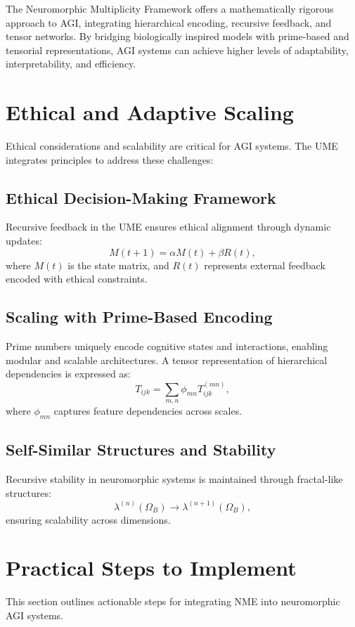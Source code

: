 \documentclass{article}
\theoremstyle{plain}
\begin{document}
\begin{itemize}
\begin{itemize}
The Neuromorphic Multiplicity Framework offers a mathematically rigorous approach to AGI, integrating hierarchical encoding, recursive feedback, and tensor networks. By bridging biologically inspired models with prime-based and tensorial representations, AGI systems can achieve higher levels of adaptability, interpretability, and efficiency.

\section{Ethical and Adaptive Scaling}
Ethical considerations and scalability are critical for AGI systems. The UME integrates principles to address these challenges:
\subsection{Ethical Decision-Making Framework}
Recursive feedback in the UME ensures ethical alignment through dynamic updates:
\begin{equation}
M(t+1) = \alpha M(t) + \beta R(t),
\end{equation}
where $M(t)$ is the state matrix, and $R(t)$ represents external feedback encoded with ethical constraints.

\subsection{Scaling with Prime-Based Encoding}
Prime numbers uniquely encode cognitive states and interactions, enabling modular and scalable architectures. A tensor representation of hierarchical dependencies is expressed as:
\begin{equation}
T_{ijk} = \sum_{m,n} \phi_{mn} T_{ijk}^{(mn)},
\end{equation}
where $\phi_{mn}$ captures feature dependencies across scales.

\subsection{Self-Similar Structures and Stability}
Recursive stability in neuromorphic systems is maintained through fractal-like structures:
\begin{equation}
\lambda^{(n)}(\Omega_B) \to \lambda^{(n+1)}(\Omega_B),
\end{equation}
ensuring scalability across dimensions.

\section{Practical Steps to Implement}
This section outlines actionable steps for integrating NME into neuromorphic AGI systems.

\end{itemize}
\end{itemize}
\end{document}
